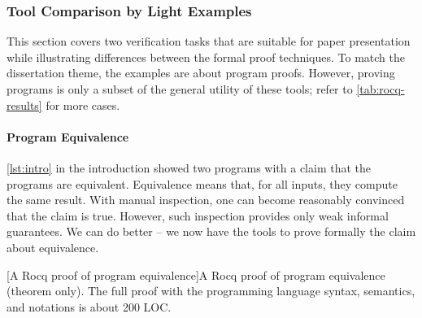 \subsubsection{Tool Comparison by Light Examples}
\label{sm-tool-examples}

This section covers two verification tasks that are suitable for paper presentation while illustrating differences between the formal proof techniques.
To match the dissertation theme, the examples are about program proofs.
However, proving programs is only a subset of the general utility of these tools;
refer to \autoref{tab:rocq-results} for more cases.

\paragraph{Program Equivalence}

\autoref{lst:intro} in the introduction showed two programs with a claim that the programs are equivalent.
Equivalence means that, for all inputs, they compute the same result.
With manual inspection, one can become reasonably convinced that the claim is true.
However, such inspection provides only weak informal guarantees.
We can do better -- we now have the tools to prove formally the claim about equivalence.

\begin{center}
\begin{minipage}{\textwidth}
\captionsetup{type=lstlisting}
[A Rocq proof of program equivalence]{A Rocq proof of program equivalence (theorem only).
The full proof with the programming language syntax, semantics, and notations is about 200 LOC.}
\label{lst:eq-proof}
\end{minipage}
\end{center}

